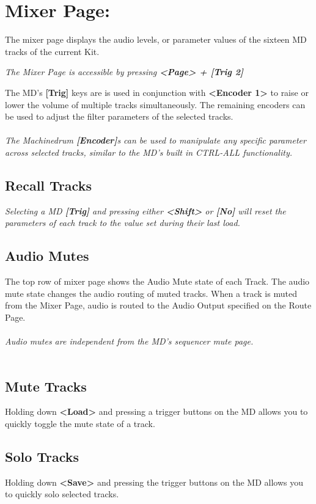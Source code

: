 \chapter{Mixer Page:}
The mixer page displays the audio levels, or parameter values of the sixteen MD tracks of the current Kit.

\textit{The Mixer Page is accessible by pressing \textbf{<Page> + [Trig 2]}}


The MD's \textbf{[Trig]} keys are is used in conjunction with \textbf{<Encoder 1>} to raise or lower the volume of multiple tracks simultaneously. The remaining encoders can be used to adjust the filter parameters of the selected tracks.\\\\
\textit{The Machinedrum \textbf{[Encoder]}s can be used to manipulate any specific parameter across selected tracks, similar to the MD's built in CTRL-ALL functionality.}
\section{Recall Tracks}
\textit{Selecting a MD \textbf{[Trig]} and pressing either \textbf{<Shift>} or \textbf{[No]} will reset the parameters of each track to the value set during their last load.}
\section{Audio Mutes}
The top row of mixer page shows the Audio Mute state of each Track. The audio mute state changes the audio routing of muted tracks. When a track is muted from the Mixer Page, audio is routed to the Audio Output specified on the Route Page.\\
\\
\textit{Audio mutes are independent from the MD's sequencer mute page.}
\\\\
\section{Mute Tracks}
Holding down \textbf{<Load>} and pressing a trigger buttons on the MD allows you to quickly toggle the mute state of a track.
\section{Solo Tracks}
Holding down \textbf{<Save>} and pressing the trigger buttons on the MD allows you to quickly solo selected tracks.\\\\

